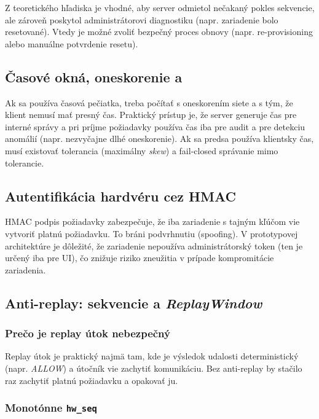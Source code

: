 \documentclass[journal,a4paper,onecolumn]{IEEEtran}
\begin{document}
Z teoretického hľadiska je vhodné, aby server odmietol nečakaný pokles sekvencie, ale zároveň poskytol administrátorovi diagnostiku (napr. zariadenie bolo resetované). Vtedy je možné zvoliť bezpečný proces obnovy (napr. re-provisioning alebo manuálne potvrdenie resetu).

\subsection{Časové okná, oneskorenie a }

Ak sa používa časová pečiatka, treba počítať s oneskorením siete a s tým, že klient nemusí mať presný čas. Praktický prístup je, že server generuje čas pre interné správy a pri príjme požiadavky používa čas iba pre audit a pre detekciu anomálií (napr. nezvyčajne dlhé oneskorenie). Ak sa predsa používa klientsky čas, musí existovať tolerancia (maximálny \emph{skew}) a fail-closed správanie mimo tolerancie.

\subsection{Autentifikácia hardvéru cez HMAC}

HMAC podpis požiadavky zabezpečuje, že iba zariadenie s tajným kľúčom vie vytvoriť platnú požiadavku. To bráni podvrhnutiu (spoofing). V prototypovej architektúre je dôležité, že zariadenie nepoužíva administrátorský token (ten je určený iba pre UI), čo znižuje riziko zneužitia v prípade kompromitácie zariadenia.

\subsection{Anti-replay: sekvencie a \emph{ReplayWindow}}

\subsubsection{Prečo je replay útok nebezpečný}

Replay útok je praktický najmä tam, kde je výsledok udalosti deterministický (napr. \emph{ALLOW}) a útočník vie zachytiť komunikáciu. Bez anti-replay by stačilo raz zachytiť platnú požiadavku a opakovať ju.

\subsubsection{Monotónne \texttt{hw\_seq}}
\end{document}
